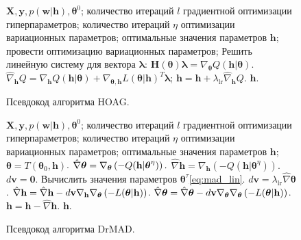 \begin{figure}[tbh!]
 \begin{algorithmic}[1]
\REQUIRE $\mathbf{X}, \mathbf{y}, p(\mathbf{w}|\mathbf{h}), \boldsymbol{\theta}^0$;
\REQUIRE количество итераций $l$ градиентной оптимизации гиперпараметров; 
\REQUIRE количество итераций $\eta$ оптимизации вариационных параметров;
\ENSURE оптимальные значения параметров $\mathbf{h}$;
\STATE провести оптимизацию вариационных параметров;
\STATE Решить линейную систему для вектора $\boldsymbol{\lambda}$: $\mathbf{H}(\boldsymbol{\theta})\boldsymbol{\lambda} =  \nabla_{\boldsymbol{\theta}} Q( \mathbf{h}|\boldsymbol{\theta})$.
\STATE $\hat{\nabla}_{\mathbf{h}}Q = \nabla_{\mathbf{h}}Q(\mathbf{h}|\boldsymbol{\theta}) +\nabla_{\boldsymbol{\theta}, \mathbf{h}} L(\boldsymbol{\theta}| \mathbf{h})^T\boldsymbol{\lambda}$;
\STATE $\mathbf{h} = \mathbf{h} + \lambda_{\text{lr}}\hat{\nabla}_{\mathbf{h}}Q$.
\ENDFOR
\RETURN $\mathbf{h}$.
\end{algorithmic}
\caption{Псевдокод алгоритма HOAG.}
\label{alg:hoag}

\end{figure}


\begin{figure}[tbh!]
 \begin{algorithmic}[1]
\REQUIRE $\mathbf{X}, \mathbf{y}, p(\mathbf{w}|\mathbf{h}), \boldsymbol{\theta}^0$;
\REQUIRE количество итераций $l$ градиентной оптимизации гиперпараметров; 
\REQUIRE количество итераций $\eta$ оптимизации вариационных параметров;
\ENSURE оптимальные значения параметров $\mathbf{h}$;
\STATE $\boldsymbol{\theta} = T(\boldsymbol{\theta}_0, \mathbf{h})$.
\STATE $\hat{\nabla} \boldsymbol{\theta} = \nabla_{\boldsymbol{\theta}} \left(-Q( \mathbf{h}| {\boldsymbol{\theta}}^\eta)\right).$  
\STATE $\hat{\nabla} \mathbf{h} = \nabla_\mathbf{h} \left(-Q( \mathbf{h}| {\boldsymbol{\theta}}^\eta)\right).$ 
\STATE $d\mathbf{v} = \mathbf{0}.$
\STATE Вычислить значения параметров $\boldsymbol{\theta}^\tau$\eqref{eq:mad_lin}.
\STATE $d\mathbf{v} =   \lambda_{\text{lr}} \hat{\nabla} {\boldsymbol{\theta}}$.
\STATE $\hat{\nabla} \mathbf{h} =  \hat{\nabla} \mathbf{h} - d\mathbf{v}\nabla_{\mathbf{h}} \nabla_{\boldsymbol{\theta}} \left(-L(\boldsymbol{\theta}|\mathbf{h})\right)$.
\STATE $\hat{\nabla} \boldsymbol{\theta}  = \hat{\nabla} \boldsymbol{\theta}  - d\mathbf{v}\nabla_{\boldsymbol{\theta}} \nabla_{\boldsymbol{\theta}} \left(-L(\boldsymbol{\theta}|\mathbf{h})\right)$.
\ENDFOR
\STATE $\mathbf{h} = \mathbf{h} - \hat{\nabla} \mathbf{h}.$
\ENDFOR
\RETURN $\mathbf{h}$.
\end{algorithmic}
\caption{Псевдокод алгоритма DrMAD.}
\label{alg:drmad}

\end{figure}

